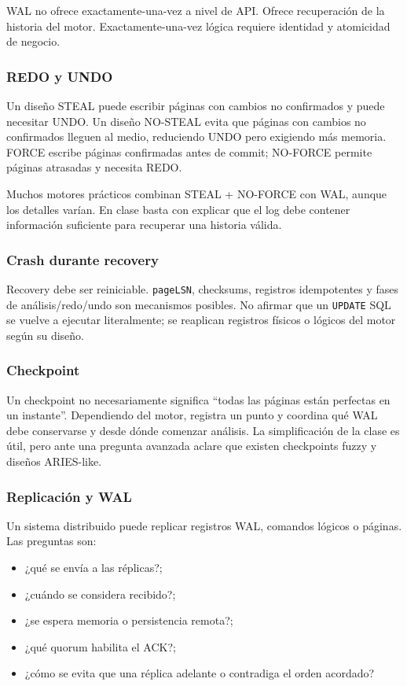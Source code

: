 \documentclass[variant=docente,cover=institutional,mode=screen]{ua-engineering-v6-article}
\begin{document}
WAL no ofrece exactamente-una-vez a nivel de API. Ofrece recuperación de la historia del motor. Exactamente-una-vez lógica requiere identidad y atomicidad de negocio.

\subsubsection*{REDO y UNDO}

Un diseño STEAL puede escribir páginas con cambios no confirmados y puede necesitar UNDO. Un diseño NO-STEAL evita que páginas con cambios no confirmados lleguen al medio, reduciendo UNDO pero exigiendo más memoria. FORCE escribe páginas confirmadas antes de commit; NO-FORCE permite páginas atrasadas y necesita REDO.

Muchos motores prácticos combinan STEAL + NO-FORCE con WAL, aunque los detalles varían. En clase basta con explicar que el log debe contener información suficiente para recuperar una historia válida.

\subsubsection*{Crash durante recovery}

Recovery debe ser reiniciable. \texttt{pageLSN}, checksums, registros idempotentes y fases de análisis/redo/undo son mecanismos posibles. No afirmar que un \texttt{UPDATE} SQL se vuelve a ejecutar literalmente; se reaplican registros físicos o lógicos del motor según su diseño.

\subsubsection*{Checkpoint}

Un checkpoint no necesariamente significa ``todas las páginas están perfectas en un instante''. Dependiendo del motor, registra un punto y coordina qué WAL debe conservarse y desde dónde comenzar análisis. La simplificación de la clase es útil, pero ante una pregunta avanzada aclare que existen checkpoints fuzzy y diseños ARIES-like.

\subsubsection*{Replicación y WAL}

Un sistema distribuido puede replicar registros WAL, comandos lógicos o páginas. Las preguntas son:

\begin{itemize}
\item ¿qué se envía a las réplicas?;
\item ¿cuándo se considera recibido?;
\item ¿se espera memoria o persistencia remota?;
\item ¿qué quorum habilita el ACK?;
\item ¿cómo se evita que una réplica adelante o contradiga el orden acordado?
\end{itemize}
\end{document}
